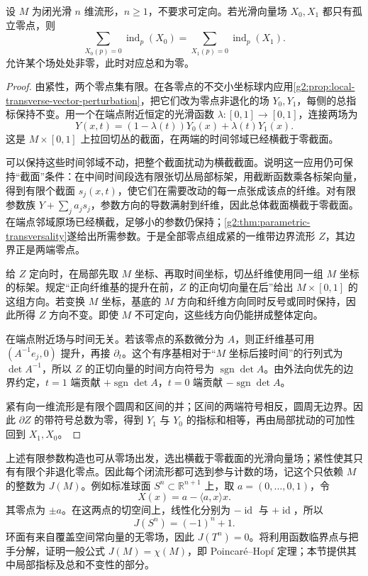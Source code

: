 \begin{theorem}\label{g2:thm:total-vector-index-invariance}
	设 \(M\) 为闭光滑 \(n\) 维流形，\(n\ge1\)，不要求可定向。若光滑向量场 \(X_0,X_1\) 都只有孤立零点，则
	\[
		\sum_{X_0(p)=0}\operatorname{ind}_p(X_0)
		=\sum_{X_1(p)=0}\operatorname{ind}_p(X_1).
	\]
	允许某个场处处非零，此时对应总和为零。
\end{theorem}
\begin{proof}
	由紧性，两个零点集有限。在各零点的不交小坐标球内应用\cref{g2:prop:local-transverse-vector-perturbation}，把它们改为零点非退化的场 \(Y_0,Y_1\)，每侧的总指标保持不变。用一个在端点附近恒定的光滑函数 \(\lambda:[0,1]\to[0,1]\)，连接两场为
	\[
		Y(x,t)=(1-\lambda(t))Y_0(x)+\lambda(t)Y_1(x).
	\]
	这是 \(M\times[0,1]\) 上拉回切丛的截面，在两端的时间邻域已经横截于零截面。

	可以保持这些时间邻域不动，把整个截面扰动为横截截面。说明这一应用仍可保持“截面”条件：在中间时间段选有限张切丛局部标架，用截断函数乘各标架向量，得到有限个截面 \(s_j(x,t)\)，使它们在需要改动的每一点张成该点的纤维。对有限参数族 \(Y+\sum_ja_js_j\)，参数方向的导数满射到纤维，因此总体截面横截于零截面。在端点邻域原场已经横截，足够小的参数仍保持；\cref{g2:thm:parametric-transversality}遂给出所需参数。于是全部零点组成紧的一维带边界流形 \(Z\)，其边界正是两端零点。

	给 \(Z\) 定向时，在局部先取 \(M\) 坐标、再取时间坐标，切丛纤维使用同一组 \(M\) 坐标的标架。规定“正向纤维基的提升在前，\(Z\) 的正向切向量在后”给出 \(M\times[0,1]\) 的这组方向。若变换 \(M\) 坐标，基底的 \(M\) 方向和纤维方向同时反号或同时保持，因此所得 \(Z\) 方向不变。即使 \(M\) 不可定向，这些线方向仍能拼成整体定向。

	在端点附近场与时间无关。若该零点的系数微分为 \(A\)，则正纤维基可用 \((A^{-1}e_j,0)\) 提升，再接 \(\partial_t\)。这个有序基相对于“\(M\) 坐标后接时间”的行列式为 \(\det A^{-1}\)，所以 \(Z\) 的正切向量的时间方向符号为 \(\operatorname{sgn}\det A\)。由外法向优先的边界约定，\(t=1\) 端贡献 \(+\operatorname{sgn}\det A\)，\(t=0\) 端贡献 \(-\operatorname{sgn}\det A\)。

	紧有向一维流形是有限个圆周和区间的并；区间的两端符号相反，圆周无边界。因此 \(\partial Z\) 的带符号总数为零，得到 \(Y_1\) 与 \(Y_0\) 的指标和相等，再由局部扰动的可加性回到 \(X_1,X_0\)。
\end{proof}

上述有限参数构造也可从零场出发，选出横截于零截面的光滑向量场；紧性使其只有有限个非退化零点。因此每个闭流形都可选到参与计数的场，记这个只依赖 \(M\) 的整数为 \(J(M)\)。例如标准球面 \(S^n\subset\mathbb R^{n+1}\) 上，取 \(a=(0,\ldots,0,1)\)，令
\[
	X(x)=a-\langle a,x\rangle x.
\]
其零点为 \(\pm a\)。在这两点的切空间上，线性化分别为 \(-\operatorname{id}\) 与 \(+\operatorname{id}\)，所以
\[
	J(S^n)=(-1)^n+1.
\]
环面有来自覆盖空间常向量的无零场，因此 \(J(T^n)=0\)。将利用函数临界点与把手分解，证明一般公式 \(J(M)=\chi(M)\)，即 Poincaré--Hopf 定理；本节提供其中局部指标及总和不变性的部分。

